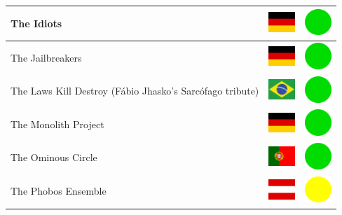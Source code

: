 \documentclass[12pt, a4paper, twoside]{report}
\begin{document}
\begin{center}
\begin{longtable}{|p{5cm}|p{2cm}|p{2cm}|}
The Idiots & \includegraphics[width=1cm]{4x3/de} & \includegraphics[width=1cm]{likes/y} \\ \hline
The Jailbreakers & \includegraphics[width=1cm]{4x3/de} & \includegraphics[width=1cm]{likes/y} \\ \hline
The Laws Kill Destroy (Fábio Jhasko's Sarcófago tribute) & \includegraphics[width=1cm]{4x3/br} & \includegraphics[width=1cm]{likes/y} \\ \hline
The Monolith Project & \includegraphics[width=1cm]{4x3/de} & \includegraphics[width=1cm]{likes/y} \\ \hline
The Ominous Circle & \includegraphics[width=1cm]{4x3/pt} & \includegraphics[width=1cm]{likes/y} \\ \hline
The Phobos Ensemble & \includegraphics[width=1cm]{4x3/at} & \includegraphics[width=1cm]{likes/m} \\ \hline

\end{longtable}
\end{center}
\end{document}
